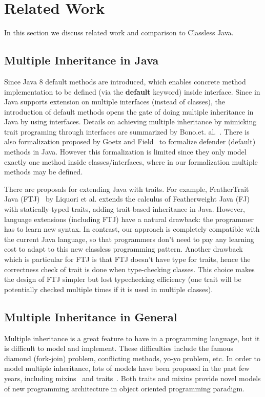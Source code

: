 \section{Related Work}\label{sec:related}
In this section we discuss related work and comparison to Classless Java.

\subsection{Multiple Inheritance in Java}
Since Java 8 default methods are introduced, which enables concrete method
implementation to be defined (via the \textbf{default} keyword) inside
interface. Since in Java supports extension on multiple interfaces (instead of
classes), the introduction of default methods opens the gate of doing multiple
inheritance in Java by using interfaces. Details on achieving multiple
inheritance by mimicking trait programing through interfaces are summarized by
Bono.et. al.~\cite{bono14}. There is also formalization proposed by
Goetz and Field~\cite{goetz12fdefenders} to formalize defender (default) methods
in Java. However this formalization is limited since they only model exactly one
method inside classes/interfaces, where in our formalization multiple methods
may be defined.

There are proposals for extending Java with traits. For example, FeatherTrait
Java (FTJ)~\cite{Liquori08ftj} by Liquori et al. extends the calculus of
Featherweight Java (FJ)~\cite{Igarashi01FJ} with statically-typed traits, adding
trait-based inheritance in Java. However, language extensions (including FTJ)
have a natural drawback: the programmer has to learn new syntax. In contrast,
our approach is completely compatible with the current Java language, so that
programmers don't need to pay any learning cost to adapt to this new classless
programming pattern. Another drawback which is particular for FTJ is that FTJ
doesn't have type for traits, hence the correctness check of trait is done when
type-checking classes. This choice makes the design of FTJ simpler but lost
typechecking efficiency (one trait will be potentially checked multiple times if
it is used in multiple classes).

\subsection{Multiple Inheritance in General}
Multiple inheritance is a great feature to have in a programming language, but
it is difficult to model and implement. These difficulties include the famous
diamond (fork-join) problem, conflicting methods, yo-yo problem, etc. In order
to model multiple inheritance, lots of models have been proposed in the past few
years, including mixins~\cite{bracha90mixin} and traits~\cite{scharli03traits}.
Both traits and mixins provide novel models of new programming architecture in
object oriented programming paradigm. 

